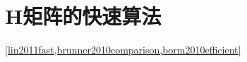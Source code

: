 

\section{H矩阵的快速算法}
\ref{lin2011fast,brunner2010comparison,borm2010efficient}
\putbib[20130104H-matrix]
\newpage
